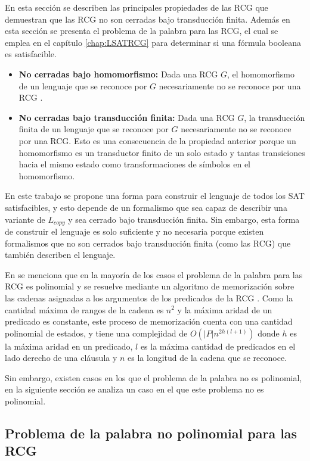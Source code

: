 En esta sección se describen las principales propiedades de las RCG que demuestran que las RCG no son cerradas 
bajo transducción finita. Además en esta sección se presenta el problema de la palabra 
para las RCG, el cual se emplea en el capítulo \ref{chap:LSATRCG} para determinar si una fórmula booleana es satisfacible.

\begin{itemize}
    \item  \textbf{No cerradas bajo homomorfismo:} Dada una RCG $G$, el homomorfismo de un lenguaje que se reconoce por $G$ necesariamente no se reconoce por una RCG \cite{propertiesRCGBib}.
    \item \textbf{No cerradas bajo transducción finita:} Dada una RCG $G$, la transducción finita de un lenguaje que se reconoce por $G$ necesariamente no se reconoce por una RCG. Esto es una consecuencia de la propiedad anterior porque un homomorfismo es un transductor finito de un solo estado y tantas transiciones hacia el mismo estado como transformaciones de símbolos en el homomorfismo.
\end{itemize}

En este trabajo se propone una forma para construir el lenguaje de todos los SAT satisfacibles, y esto depende de un formalismo que 
sea capaz de describir una variante de $L_{copy}$ y sea cerrado bajo transducción finita. Sin embargo, esta forma de construir el lenguaje es solo suficiente 
y no necesaria porque existen formalismos que no son cerrados bajo transducción finita (como las RCG) que también 
describen el lenguaje.

En \cite{mainRCGBib} se menciona que en la mayoría de los casos el problema de la palabra para las RCG es polinomial y se resuelve mediante un algoritmo de memorización sobre las cadenas asignadas a los argumentos de los predicados de la RCG \cite{mainRCGBib}.  Como la cantidad máxima de rangos de la cadena es $n^2$ y la máxima aridad de un predicado es constante, este proceso de memorización cuenta con una cantidad polinomial de estados, y tiene una complejidad de $O(|P|n^{2h(l+1)})$ donde $h$ es la máxima aridad en un predicado, $l$ es la máxima cantidad de predicados en el lado derecho de una cláusula y $n$ es la longitud de la cadena que se reconoce.

Sin embargo, existen casos en los que el problema de la palabra no es polinomial, en la siguiente sección se analiza un caso en el que este problema no es polinomial.

\subsection{Problema de la palabra no polinomial para las RCG}

